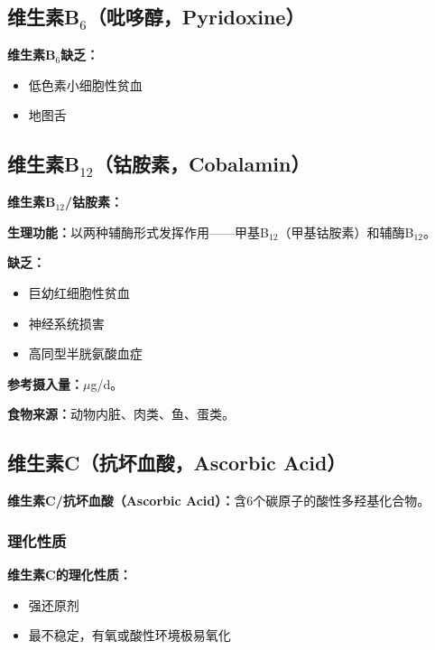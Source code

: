 \subsection{维生素B$_6$（吡哆醇，Pyridoxine）}

\begin{tipbox}
\textbf{维生素B$_6$缺乏：}
\begin{itemize}[leftmargin=*]
    \item 低色素小细胞性贫血
    \item 地图舌
\end{itemize}
\end{tipbox}

\subsection{维生素B$_{12}$（钴胺素，Cobalamin）}

\begin{tipbox}
\textbf{维生素B$_{12}$/钴胺素：}

\textbf{生理功能：}以两种辅酶形式发挥作用——甲基B$_{12}$（甲基钴胺素）和辅酶B$_{12}$。

\textbf{缺乏：}
\begin{itemize}[leftmargin=*]
    \item 巨幼红细胞性贫血
    \item 神经系统损害
    \item 高同型半胱氨酸血症
\end{itemize}

\textbf{参考摄入量：}$\mu$g/d。

\textbf{食物来源：}动物内脏、肉类、鱼、蛋类。
\end{tipbox}

\subsection{维生素C（抗坏血酸，Ascorbic Acid）}

\begin{defbox}
\textbf{维生素C/抗坏血酸（Ascorbic Acid）：}含6个碳原子的酸性多羟基化合物。
\end{defbox}

\subsubsection{理化性质}

\begin{tipbox}
\textbf{维生素C的理化性质：}
\begin{itemize}[leftmargin=*]
    \item 强还原剂
    \item 最不稳定，有氧或酸性环境极易氧化
\end{itemize}
\end{tipbox}

